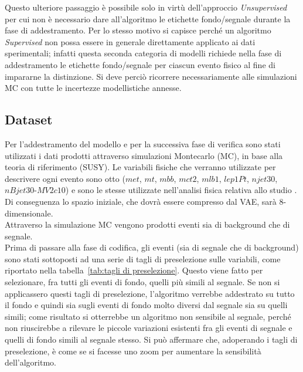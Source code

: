 Questo ulteriore passaggio è possibile solo in virtù dell'approccio \textit{Unsupervised} per cui non è necessario dare all'algoritmo le etichette fondo/segnale durante la fase di addestramento. Per lo stesso motivo si capisce perché un algoritmo \textit{Supervised} non possa essere in generale direttamente applicato ai dati sperimentali; infatti questa seconda categoria di modelli richiede nella fase di addestramento le etichette fondo/segnale per ciascun evento fisico al fine di impararne la distinzione. Si deve perciò ricorrere necessariamente alle simulazioni MC con tutte le incertezze modellistiche annesse. 


\newpage


\subsection{Dataset}
\label{dataset}
Per l'addestramento del modello e per la successiva fase di verifica sono stati utilizzati i dati prodotti attraverso simulazioni Montecarlo (MC), in base alla teoria di riferimento (SUSY). Le variabili fisiche che verranno utilizzate per descrivere ogni evento sono otto ($\textit{met}$, $\textit{mt}$, $\textit{mbb}$, $\textit{mct2}$, $\textit{mlb1}$, $\textit{lep1Pt}$, $\textit{njet30}$, $\textit{nBjet30-MV2c10}$) e sono le stesse utilizzate nell'analisi fisica relativa allo studio \cite{susy_alberto}. Di conseguenza lo spazio iniziale, che dovrà essere compresso dal VAE, sarà 8-dimensionale. \\
Attraverso la simulazione MC vengono prodotti eventi sia di background che di segnale.\\ 
Prima di passare alla fase di codifica, gli eventi (sia di segnale che di background) sono stati sottoposti ad una serie di tagli di preselezione sulle variabili, come riportato nella tabella~\ref{tab:tagli di preselezione}. Questo viene fatto per selezionare, fra tutti gli eventi di fondo, quelli più simili al segnale. Se non si applicassero questi tagli di preselezione, l'algoritmo verrebbe addestrato su tutto il fondo e quindi sia sugli eventi di fondo molto diversi dal segnale sia su quelli simili; come risultato si otterrebbe un algoritmo non sensibile al segnale, perché non riuscirebbe a rilevare le piccole variazioni esistenti fra gli eventi di segnale e quelli di fondo simili al segnale stesso. Si può affermare che, adoperando i tagli di preselezione, è come se si facesse uno zoom per aumentare la sensibilità dell'algoritmo. 

